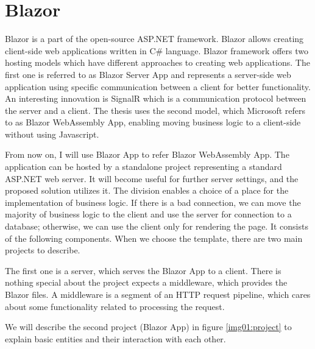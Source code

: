 \section{Blazor}

Blazor is a part of the open-source ASP.NET framework.
Blazor allows creating client-side web applications written in C\# language.
Blazor framework offers two hosting models  which have different approaches to creating web applications. 
The first one is referred to as Blazor Server App and represents a server-side web application using specific communication between a client for better functionality.
An interesting innovation is SignalR which is a communication protocol between the server and a client.
The thesis uses the second model, which Microsoft refers to as Blazor WebAssembly App, enabling moving business logic to a client-side without using Javascript.
\par
From now on, I will use Blazor App to refer Blazor WebAssembly App.
The application can be hosted by a standalone project representing a standard ASP.NET web server.
It will become useful for further server settings, and the proposed solution utilizes it.
The division enables a choice of a place for the implementation of business logic.
If there is a bad connection, we can move the majority of business logic to the client and use the server for connection to a database; otherwise, we can use the client only for rendering the page. It consists of the following components. 
When we choose the template, there are two main projects to describe.
\par
The first one is a server, which serves the Blazor App to a client.
There is nothing special about the project expects a middleware, which provides the Blazor files.
A middleware is a segment of an HTTP request pipeline, which cares about some functionality related to processing the request.
\par
We will describe the second project (Blazor App) in figure \ref{img01:project} to explain basic entities and their interaction with each other.
\par
